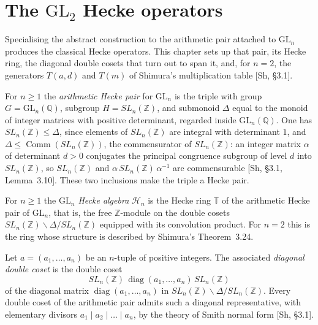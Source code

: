 \chapter{The $\mathrm{GL}_2$ Hecke operators}\label{chap:gl2-operators}

Specialising the abstract construction to the arithmetic pair attached to $\mathrm{GL}_n$
produces the classical Hecke operators. This chapter sets up that pair, its Hecke ring, the
diagonal double cosets that turn out to span it, and, for $n=2$, the generators $T(a,d)$ and
$T(m)$ of Shimura's multiplication table [Sh, \S3.1].

\begin{definition}\label{def:GL-pair}
\leanok
For $n\ge 1$ the \emph{arithmetic Hecke pair} for $\mathrm{GL}_n$ is the triple with group
$G=\mathrm{GL}_n(\mathbb{Q})$, subgroup $H=SL_n(\mathbb{Z})$, and submonoid $\Delta$ equal
to the monoid of integer matrices with positive determinant, regarded inside
$\mathrm{GL}_n(\mathbb{Q})$. One has $SL_n(\mathbb{Z})\le\Delta$, since elements of
$SL_n(\mathbb{Z})$ are integral with determinant $1$, and $\Delta\le\operatorname{Comm}(SL_n(\mathbb{Z}))$,
the commensurator of $SL_n(\mathbb{Z})$: an integer matrix $\alpha$ of determinant $d>0$
conjugates the principal congruence subgroup of level $d$ into $SL_n(\mathbb{Z})$, so
$SL_n(\mathbb{Z})$ and $\alpha\,SL_n(\mathbb{Z})\,\alpha^{-1}$ are commensurable
[Sh, \S3.1, Lemma~3.10]. These two inclusions make the triple a Hecke pair.
\end{definition}

\begin{definition}\label{def:hecke-algebra}
\leanok
For $n\ge 1$ the \emph{$\mathrm{GL}_n$ Hecke algebra} $\mathcal{H}_n$ is the Hecke ring
$\mathbb{T}$ of the arithmetic Hecke pair of $\mathrm{GL}_n$, that is, the free
$\mathbb{Z}$-module on the double cosets $SL_n(\mathbb{Z})\backslash\Delta/SL_n(\mathbb{Z})$
equipped with its convolution product. For $n=2$ this is the ring whose structure is
described by Shimura's Theorem~3.24.
\end{definition}

\begin{definition}\label{def:T-diag}
\leanok
Let $a=(a_1,\dots,a_n)$ be an $n$-tuple of positive integers. The associated
\emph{diagonal double coset} is the double coset
\[
  SL_n(\mathbb{Z})\,\operatorname{diag}(a_1,\dots,a_n)\,SL_n(\mathbb{Z})
\]
of the diagonal matrix $\operatorname{diag}(a_1,\dots,a_n)$ in
$SL_n(\mathbb{Z})\backslash\Delta/SL_n(\mathbb{Z})$. Every double coset of the arithmetic
pair admits such a diagonal representative, with elementary divisors $a_1\mid a_2\mid\dots\mid a_n$,
by the theory of Smith normal form [Sh, \S3.1].
\end{definition}

